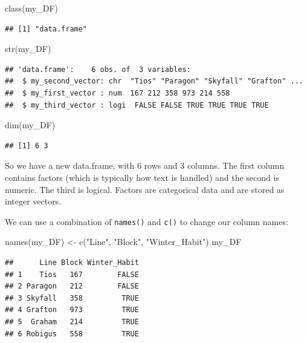 \documentclass[
]{book}
\newenvironment{Shaded}{\begin{snugshade}}{\end{snugshade}}
\newcommand{\FunctionTok}[1]{\textcolor[rgb]{0.00,0.00,0.00}{#1}}
\newcommand{\NormalTok}[1]{#1}
\newcommand{\OtherTok}[1]{\textcolor[rgb]{0.56,0.35,0.01}{#1}}
\newcommand{\StringTok}[1]{\textcolor[rgb]{0.31,0.60,0.02}{#1}}
\begin{document}
\begin{Shaded}
\begin{Highlighting}[]
\FunctionTok{class}\NormalTok{(my\_DF)}
\end{Highlighting}
\end{Shaded}

\begin{verbatim}
## [1] "data.frame"
\end{verbatim}

\begin{Shaded}
\begin{Highlighting}[]
\FunctionTok{str}\NormalTok{(my\_DF)}
\end{Highlighting}
\end{Shaded}

\begin{verbatim}
## 'data.frame':    6 obs. of  3 variables:
##  $ my_second_vector: chr  "Tios" "Paragon" "Skyfall" "Grafton" ...
##  $ my_first_vector : num  167 212 358 973 214 558
##  $ my_third_vector : logi  FALSE FALSE TRUE TRUE TRUE TRUE
\end{verbatim}

\begin{Shaded}
\begin{Highlighting}[]
\FunctionTok{dim}\NormalTok{(my\_DF)}
\end{Highlighting}
\end{Shaded}

\begin{verbatim}
## [1] 6 3
\end{verbatim}

So we have a new data.frame, with 6 rows and 3 columns. The first column contains factors (which is typically how text is handled) and the second is numeric. The third is logical. Factors are categorical data and are stored as integer vectors.

We can use a combination of \texttt{names()} and \texttt{c()} to change our column names:

\begin{Shaded}
\begin{Highlighting}[]
\FunctionTok{names}\NormalTok{(my\_DF) }\OtherTok{\textless{}{-}} \FunctionTok{c}\NormalTok{(}\StringTok{"Line"}\NormalTok{, }\StringTok{"Block"}\NormalTok{, }\StringTok{"Winter\_Habit"}\NormalTok{)}
\NormalTok{my\_DF}
\end{Highlighting}
\end{Shaded}

\begin{verbatim}
##      Line Block Winter_Habit
## 1    Tios   167        FALSE
## 2 Paragon   212        FALSE
## 3 Skyfall   358         TRUE
## 4 Grafton   973         TRUE
## 5  Graham   214         TRUE
## 6 Robigus   558         TRUE
\end{verbatim}
\end{document}
